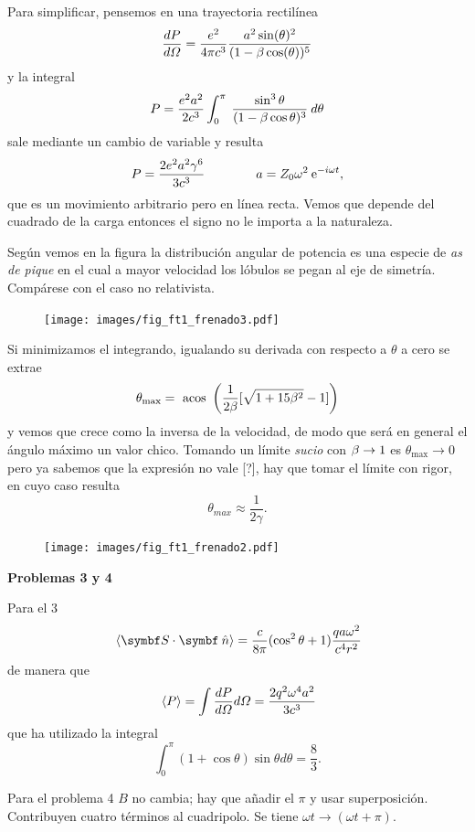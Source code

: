 \documentclass[10pt,oneside]{CBFT_book}
\begin{document}
Para simplificar, pensemos en una trayectoria rectilínea
\[
	\frac{d^{\hspace{-0.05em}} {P}}{d {\Omega}^{\hspace{-0.05em}}} = \frac{e^2}{4\pi c^3} \frac{ a^2 \sin(\theta)^2}{(1-\beta \cos(\theta))^5} 
\]
y la integral
\[
	P = \frac{e^2 a^2}{2c^3} \int_0^\pi \: \frac{\sin^3\theta}{(1-\beta\cos\theta)^3} \: d\theta
\]
sale mediante un cambio de variable y resulta
\[
	P = \frac{2 e^2 a^2 \gamma^6}{3 c^3} \qquad \qquad a = Z_0 \omega^2 \:\mathrm{e}^{-i \omega t},
\]
que es un movimiento arbitrario pero en línea recta. Vemos que depende del cuadrado de la
carga entonces el signo no le importa a la naturaleza.

Según vemos en la figura la distribución angular de potencia es una especie de {\it as de pique} en el cual
a mayor velocidad los lóbulos se pegan al eje de simetría. Compárese con el caso no relativista.

\begin{figure}[htb]
	\begin{center}
	\texttt{[image: images/fig\_ft1\_frenado3.pdf]}	 
	\end{center}
	\caption{}
\end{figure} 

Si minimizamos el integrando, igualando su derivada con respecto a $\theta$ a cero se extrae
\[
	\theta_\text{max} = \text{ acos } \left( \frac{1}{2\beta} [ \sqrt{ 1 + 15\beta^2 } - 1 ] \right)
\]
y vemos que crece como la inversa de la velocidad, de modo que será en general el ángulo
máximo un valor chico. Tomando un límite {\it sucio} con $\beta \to 1$ es $\theta_\text{max} \to 0$
pero ya sabemos que la expresión no vale [?], hay que tomar el límite con rigor, en cuyo 
caso resulta 
\[
	\theta_{max} \approx \frac{1}{2\gamma}.
\]

\begin{figure}[htb]
	\begin{center}
	\texttt{[image: images/fig\_ft1\_frenado2.pdf]}	 
	\end{center}
	\caption{}
\end{figure} 

\begin{ejemplo}{\bf Problemas 3 y 4}

Para el 3
\[
	\vm{\pe{S}{\nver}} = \frac{c}{8\pi}(\cos^2\theta+1)\frac{q a \omega^2}{c^4r^2}
\]
de manera que
\[
	\:\left\langle P \right\rangle = \int \frac{d^{\hspace{-0.05em}} {P}}{d {\Omega}^{\hspace{-0.05em}}} d\Omega = \frac{2q^2\omega^4a^2}{3c^3}
\]
que ha utilizado la integral
\[
	\int_0^\pi (1+\cos\theta) \sin\theta d\theta = \frac{8}{3}.
\]

Para el problema 4 $B$ no cambia; hay que añadir el $\pi$ y usar superposición.
Contribuyen cuatro términos al cuadripolo. Se tiene $\omega t \to (\omega t + \pi )$.
 
\end{ejemplo}
\end{document}
